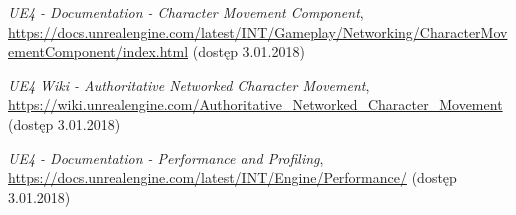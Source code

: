 \documentclass[multip]{SGGW-thesis}
\begin{document}
\begin{thebibliography}{9}
\textit{UE4 - Documentation - Character Movement Component}, \url{https://docs.unrealengine.com/latest/INT/Gameplay/Networking/CharacterMovementComponent/index.html}  (dostęp 3.01.2018)

\textit{UE4 Wiki - Authoritative Networked Character Movement}, \url{https://wiki.unrealengine.com/Authoritative_Networked_Character_Movement}  (dostęp 3.01.2018)


\textit{UE4 - Documentation - Performance and Profiling}, \url{https://docs.unrealengine.com/latest/INT/Engine/Performance/}  (dostęp 3.01.2018)

\end{thebibliography}


\beforelastpage
\end{document}
